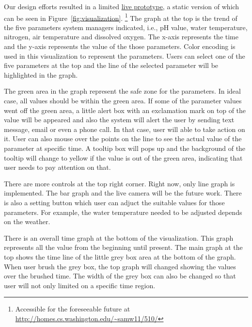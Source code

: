 \documentclass{sigchi}
\begin{document}

Our design efforts resulted in a limited \href{http://homes.cs.washington.edu/~samw11/510/}{live prototype}, a static version of which can be seen in Figure~\ref{fig:visualization}. 
\footnote{Accessible for the foreseeable future at \url{http://homes.cs.washington.edu/~samw11/510/}} The graph at the top is the trend of the five parameters system managers indicated, i.e., pH value, water temperature, nitrogen, air temperature and dissolved oxygen. The x-axis represents the time and the y-axis represents the value of the those parameters. Color encoding is used in this visualization to represent the parameters. Users can select one of the five parameters at the top and the line of the selected parameter will be highlighted in the graph. 

The green area in the graph represent the safe zone for the parameters. In ideal case, all values should be within the green area. If some of the parameter values went off the green area, a little alert box with an exclamation mark on top of the value will be appeared and also the system will alert the user by sending text message, email or even a phone call. In that case, user will able to take action on it. User can also mouse over the points on the line to see the actual value of the parameter at specific time. A tooltip box will pops up and the background of the tooltip will change to yellow if the value is out of the green area, indicating that user needs to pay attention on that.

There are more controls at the top right corner. Right now, only line graph is implemented. The bar graph and the live camera will be the future work. There is also a setting button which user can adjuct the suitable values for those parameters. For example, the water temperature needed to be adjusted depends on the weather. 

There is an overall time graph at the bottom of the visualization. This graph represents all the value from the beginning until present. The main graph at the top shows the time line of the little grey box area at the bottom of the graph. When user brush the grey box, the top graph will changed showing the values over the brushed time. The width of the grey box can also be changed so that user will not only limited on a specific time region. 
\end{document}

